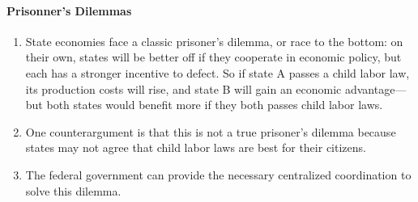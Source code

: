 \paragraph{Prisonner's Dilemmas}

\begin{enumerate}
    \item State economies face a classic prisoner's dilemma, or race to the 
    bottom: on their own, states will be better off if they cooperate in 
    economic policy, but each has a stronger incentive to defect. So if state 
    A passes a child labor law, its production costs will rise, and state B 
    will gain an economic advantage---but both states would benefit more if 
    they both passes child labor laws.
    \item One counterargument is that this is not a true prisoner's dilemma 
    because states may not agree that child labor laws are best for their 
    citizens.
    \item The federal government can provide the necessary centralized 
    coordination to solve this dilemma.
\end{enumerate}
